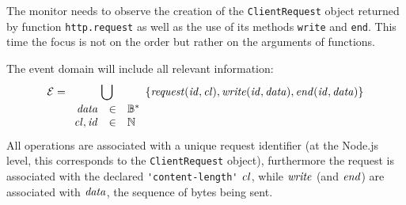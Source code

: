 The monitor needs to observe the creation of the \lstinline{ClientRequest} object returned by function \lstinline{http.request} as well as the use of its methods \lstinline{write} and \lstinline{end}.
This time the focus is not on the order but rather on the arguments of functions.

The event domain will include all relevant information:
\[ \mathcal{E} = \bigcup_{\begin{array}{rcl}\mathit{data}&\in&\mathbb{B}^*\\\mathit{cl},\mathit{id} &\in& \mathbb{N}\end{array}} \{ \mathit{request}(\mathit{id},\mathit{cl}), \mathit{write}(\mathit{id}, \mathit{data}), \mathit{end}(\mathit{id}, \mathit{data}) \} \]
All operations are associated with a unique request identifier (at the Node.js level, this corresponds to the \lstinline{ClientRequest} object), furthermore the request is associated with the declared \lstinline{'content-length'} \(\mathit{cl}\), while \(\mathit{write}\) (and \(\mathit{end}\)) are associated with \(\mathit{data}\),
the sequence of bytes being sent.




